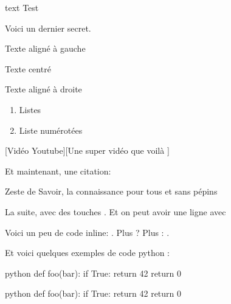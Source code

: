 \documentclass[small]{zmdocument}
\begin{document}
\begin{Spoiler}
\begin{CodeBlock}{text}
Test
\end{CodeBlock}
\end{Spoiler}

\begin{Spoiler}
Voici un dernier secret.
\end{Spoiler}

\begin{flushleft}
Texte aligné à gauche
\end{flushleft}

\begin{center}
Texte centré
\end{center}

\begin{flushright}
Texte aligné à droite
\end{flushright}

\begin{enumerate}
\item Listes
\item Liste numérotées
\end{enumerate}

[Vidéo Youtube][Une super vidéo que voilà ]


Et maintenant, une citation:

\begin{Quotation}[Clem]
Zeste de Savoir, la connaissance pour tous et sans pépins 
\end{Quotation}

La suite, avec des touches . Et on peut avoir une ligne avec

\horizontalLine

Voici un peu de code inline: . Plus ? Plus : .


Et voici quelques exemples de code python :

\begin{CodeBlock}{python}
def foo(bar):
    if True:
        return 42
    return 0
\end{CodeBlock}

\begin{CodeBlock}{python}
def foo(bar):
    if True:
        return 42
    return 0
\end{CodeBlock}
\end{document}
